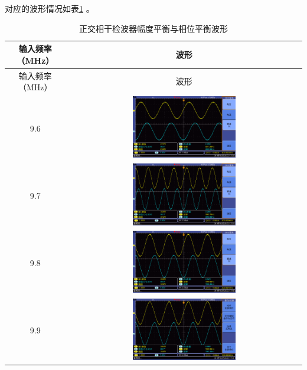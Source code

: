 \documentclass[12pt]{article}
\begin{document}
对应的波形情况如表\ref{tab:fdphxwph2}
。
\begin{longtable}{|c|c|}
    \caption{正交相干检波器幅度平衡与相位平衡波形}
    \label{tab:fdphxwph2}\\
    \hline
    输入频率（MHz）&波形\\
    \hline
    \endfirsthead

    \hline
    输入频率（MHz）&波形\\
    \hline
    \endhead

    \hline
    \endfoot

    \hline
    \endlastfoot

    9.6 & \includegraphics[width=0.45\textwidth]{data3/new/F0000TEK} \\
    \hline
    9.7 & \includegraphics[width=0.45\textwidth]{data3/new/F0001TEK} \\
    \hline
    9.8 &  \includegraphics[width=0.45\textwidth]{data3/new/F0002TEK}\\
    \hline
    9.9 & \includegraphics[width=0.45\textwidth]{data3/new/F0003TEK} \\

\end{longtable}
\end{document}
